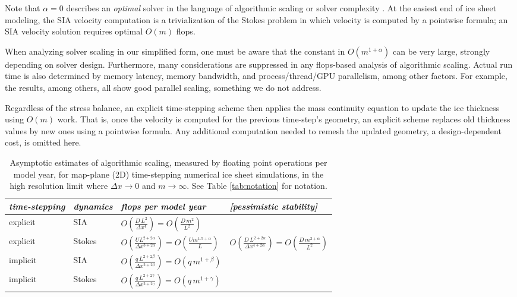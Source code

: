 \documentclass[twocolumn,letterpaper]{igs}
\begin{document}
Note that $\alpha=0$ describes an \emph{optimal} solver in the language of algorithmic scaling or solver complexity \citep{Bueler2021}.  At the easiest end of ice sheet modeling, the SIA velocity computation is a trivialization of the Stokes problem in which velocity is computed by a pointwise formula; an SIA velocity solution requires optimal $O(m)$ flops.

When analyzing solver scaling in our simplified form, one must be aware that the constant in $O(m^{1+\alpha})$ can be very large, strongly depending on solver design.  Furthermore, many considerations are suppressed in any flops-based analysis of algorithmic scaling.  Actual run time is also determined by memory latency, memory bandwidth, and process/thread/GPU parallelism, among other factors.  For example, the \cite{BrownSmithAhmadia2013,Fischleretal2022,IsaacStadlerGhattas2015,Lengetal2012,Tuminaroetal2016} results, among others, all show good parallel scaling, something we do not address.

Regardless of the stress balance, an explicit time-stepping scheme then applies the mass continuity equation to update the ice thickness using $O(m)$ work.  That is, once the velocity is computed for the previous time-step's geometry, an explicit scheme replaces old thickness values by new ones using a pointwise formula.  Any additional computation needed to remesh the updated geometry, a design-dependent cost, is omitted here.

\newcommand{\oo}[1]{\displaystyle O\left(#1\right)}
\setlength{\tabcolsep}{5pt}
\renewcommand{\arraystretch}{1.5}
\begin{table*}[ht]
{\normalsize
\begin{tabular}{llll}
\emph{time-stepping} & \emph{dynamics} & \emph{flops per model year} & \emph{[pessimistic stability]} \\ \hline
explicit & SIA    & $\oo{\frac{D\, L^2}{\Delta x^4}} = \oo{\frac{D\, m^2}{L^2}}${\Huge \strut} \\
explicit & Stokes & $\oo{\frac{U L^{2+2\alpha}}{\Delta x^{3+2\alpha}}} = \oo{\frac{U m^{1.5+\alpha}}{L}}${\Huge \strut}\phantom{x} & $\oo{\frac{D\, L^{2+2\alpha}}{\Delta x^{4+2\alpha}}} = \oo{\frac{D\,m^{2+\alpha}}{L^2}}$ \\
implicit & SIA    & $\oo{\frac{q\, L^{2+2\beta}}{\Delta x^{2+2\beta}}} = \oo{q\, m^{1+\beta}}${\Huge \strut} \\
implicit & Stokes & $\oo{\frac{q\, L^{2+2\gamma}}{\Delta x^{2+2\gamma}}} = \oo{q\, m^{1+\gamma}}${\Huge \strut}
\end{tabular}
}
\caption{Asymptotic estimates of algorithmic scaling, measured by floating point operations per model year, for map-plane (2D) time-stepping numerical ice sheet simulations, in the high resolution limit where $\Delta x\to 0$ and $m\to\infty$.  See Table \ref{tab:notation} for notation.}
\label{tab:performancemodel}
\end{table*}
\end{document}
